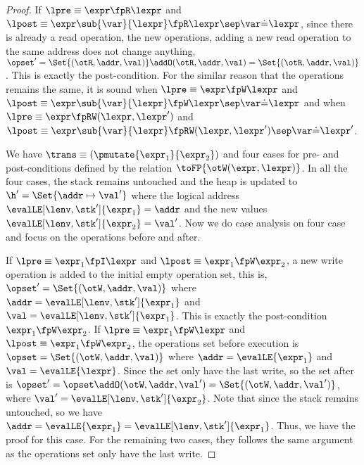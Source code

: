 \begin{proof}
If \( \lpre \equiv \expr \fpR \lexpr \) and \( \lpost \equiv \expr\sub{\var}{\lexpr} \fpR \lexpr \sep \var \dot= \lexpr \), since there is already a read operation, the new operations, adding a new read operation to the same address does not change anything, \ie \( \opset' = \Set{(\otR, \addr, \val)} \addO (\otR, \addr, \val ) = \Set{(\otR, \addr, \val)} \).
This is exactly the post-condition.
For the similar reason that the operations remains the same, it is sound when \( \lpre \equiv \expr \fpW \lexpr \) and \( \lpost \equiv \expr\sub{\var}{\lexpr} \fpW \lexpr \sep \var \dot= \lexpr \) and when \( \lpre \equiv \expr \fpRW (\lexpr,\lexpr') \) and \( \lpost \equiv \expr\sub{\var}{\lexpr} \fpRW (\lexpr,\lexpr') \sep \var \dot= \lexpr' \).


We have  \( \trans \equiv (\pmutate{\expr_{1}}{\expr_{2}}) \) and four cases for pre- and post-conditions defined by the relation \( \toFP{\otW(\expr, \lexpr)}\). 
In all the four cases, the stack remains untouched and the heap is updated to \( \h' = \Set{\addr \mapsto \val' }\) where the logical address \( \evalLE[\lenv,\stk']{\expr_{1}}  = \addr \) and the new values \( \evalLE[\lenv,\stk']{\expr_{2}} = \val'\).
Now we do case analysis on four case and focus on the operations before and after.

If \( \lpre \equiv \expr_{1} \fpI \lexpr \) and \( \lpost \equiv \expr_{1} \fpW \expr_{2} \), a new write operation is added to the initial empty operation set, this is, \( \opset' = \Set{(\otW, \addr, \val)}\) where \( \addr = \evalLE[\lenv,\stk']{\expr_{1}}\) and \( \val = \evalLE[\lenv,\stk']{\expr_{1}}\).
This is exactly the post-condition \( \expr_{1} \fpW \expr_{2} \).
If \( \lpre \equiv \expr_{1} \fpW \lexpr \) and \( \lpost \equiv \expr_{1} \fpW \expr_{2} \), the operations set before execution is \( \opset = \Set{(\otW, \addr, \val)}\) where \( \addr = \evalLE{\expr_{1}}\) and \( \val = \evalLE{\lexpr}\).
Since the set only have the last write, so the set after is \( \opset' = \opset \addO (\otW, \addr, \val') = \Set{(\otW, \addr, \val')}\), where \( \val' = \evalLE[\lenv,\stk']{\expr_{2}}\).
Note that since the stack remains untouched, so we have \( \addr = \evalLE{\expr_{1}} = \evalLE[\lenv,\stk']{\expr_{1}} \).
Thus, we have the proof for this case.
For the remaining two cases, they follows the same argument as the operations set only have the last write.



\end{proof}
